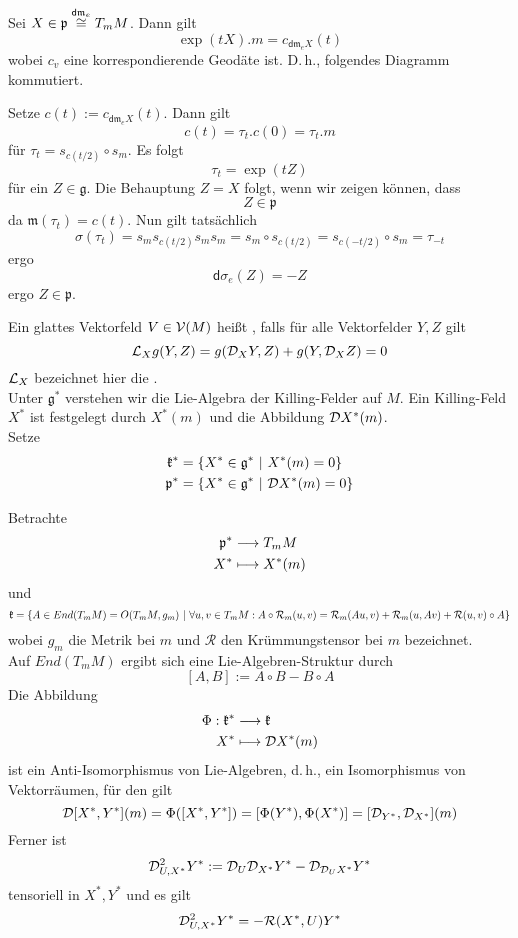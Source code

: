 \documentclass{book}
\renewcommand{\d}{\textsf{d}}
\newcommand{\pf}{\mathfrak{p}}
\newcommand{\Rc}{\mathcal{R}}
\newcommand{\g}{\mathfrak{g}}
\newcommand{\kf}{\mathfrak{k}}
\newcommand{\m}{\mathfrak{m}}
\begin{document}
\Prop{}
Sei $X \in \pf \isom{\d \m_e} T_mM$. Dann gilt
\[ \exp(tX).m = c_{\d \m_eX}(t)  \]
wobei $c_v$ eine korrespondierende Geodäte ist. D.\,h., folgendes Diagramm kommutiert.
\begin{center}
\end{center}
\begin{Beweis}{}
Setze $c(t) := c_{\d \m_eX}(t)$. Dann gilt
\[ c(t) = \tau_t.c(0) = \tau_t.m \]
für $\tau_t = s_{c(t/2)}\circ s_m$. Es folgt
\[ \tau_t = \exp(tZ) \]
für ein $Z \in \g$. Die Behauptung $Z = X$ folgt, wenn wir zeigen können, dass
\[ Z \in \pf \]
da $\m(\tau_t) = c(t)$. Nun gilt tatsächlich
\[ \sigma(\tau_t) = s_m s_{c(t/2)} s_m s_m = s_m \circ s_{c(t/2)} = s_{c(-t/2)}\circ s_m = \tau_{-t} \]
ergo
\[ \d \sigma_e(Z) = -Z \]
ergo $Z \in \pf$.
\end{Beweis}

\Def{}
Ein glattes Vektorfeld $V \in \mathcal{V}(M)$ heißt , falls für alle Vektorfelder $Y,Z$ gilt
\[ \mathcal{L}_X g(Y,Z) = g(\mathcal{D}_X Y, Z) + g(Y, \mathcal{D}_X Z) = 0 \]
$\mathcal{L}_X$ bezeichnet hier die .\\
Unter $\g^*$ verstehen wir die Lie-Algebra der Killing-Felder auf $M$. Ein Killing-Feld $X^*$ ist festgelegt durch $X^*(m)$ und die Abbildung $\mathcal{D} X^*(m)$.\\
Setze
\begin{align*}
\kf^* &= \{X^* \in \g^*~|~X^*(m) = 0\}\\
\pf^* &= \{X^* \in \g^*~|~\D X^*(m) = 0\}
\end{align*}

\Bem{}
Betrachte
\begin{align*}
\pf^* & \Pfeil{} T_mM\\
X^* & \longmapsto X^*(m)
\end{align*}
und
\[ \kf = \set{A \in End(T_mM) = O(T_mM, g_m)}{ \forall u,v \in T_mM: A \circ \Rc_m(u,v) = \Rc_m(Au,v) + \Rc_m(u,Av) + \Rc(u,v) \circ A } \]
wobei $g_m$ die Metrik bei $m$ und $\Rc$ den Krümmungstensor bei $m$ bezeichnet.\\
Auf $End(T_mM)$ ergibt sich eine Lie-Algebren-Struktur durch
\[ [A,B] := A\circ B - B\circ A \]
Die Abbildung
\begin{align*}
\Phi: \kf^* & \Pfeil{} \kf\\
X^* & \longmapsto \D X^*(m)
\end{align*}
ist ein Anti-Isomorphismus von Lie-Algebren, d.\,h., ein Isomorphismus von Vektorräumen, für den gilt
\[ \mathcal{D} [X^*,Y^*](m) = \Phi([X^*, Y^*]) = [\Phi(Y^*), \Phi(X^*)] = [\mathcal{D}_{Y^*}, \mathcal{D}_{X^*}](m) \]
Ferner ist
\[ \mathcal{D}_{U,X^*}^2Y^* := \mathcal{D}_U \mathcal{D}_{X^*}Y^* - \mathcal{D}_{\mathcal{D}_UX^*}Y^* \]
tensoriell in $X^*,Y^*$ und es gilt
\[ \D_{U,X^*}^2Y^* = - \Rc(X^*, U)Y^* \]
\end{document}
